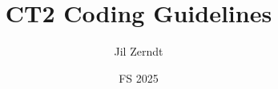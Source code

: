 \documentclass[a4paper, fontsize = 8pt, landscape]{scrartcl}
\title{CT2 Coding Guidelines}
\author{Jil Zerndt}
\date{FS 2025}
\begin{document}
\begin{multicols}{2}
	\thispagestyle{TitlePageStyle}
	\maketitle
	\sffamily
	
	\raggedcolumns
\end{multicols}
\end{document}
